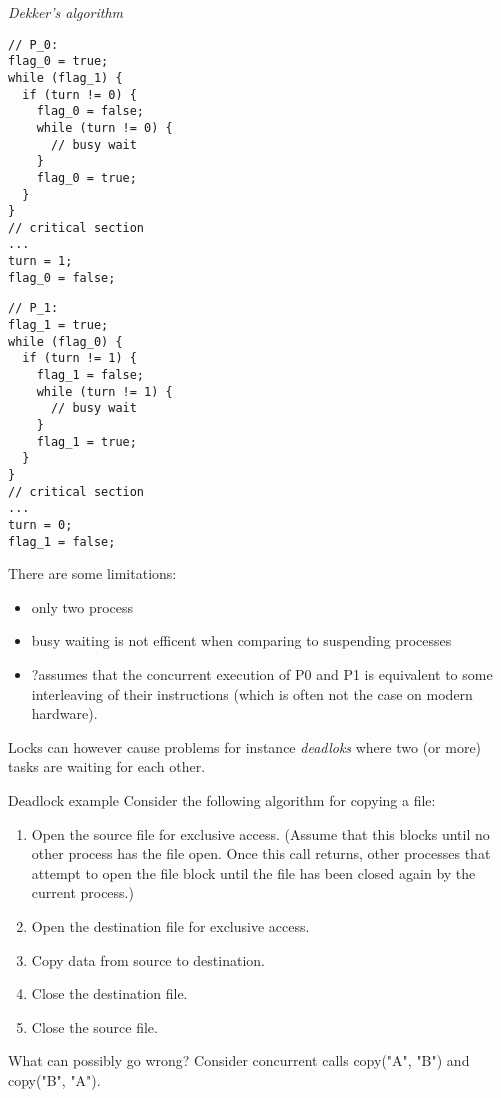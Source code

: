 \begin{definitionblock}{\textit{Dekker's algorithm}}

\begin{BVerbatim}[baseline=c]
// P_0:
flag_0 = true;
while (flag_1) {
  if (turn != 0) {
    flag_0 = false;
    while (turn != 0) {
      // busy wait
    }
    flag_0 = true;
  }
}
// critical section
...
turn = 1;
flag_0 = false;
\end{BVerbatim}
\begin{BVerbatim}[baseline=c]
// P_1:
flag_1 = true;
while (flag_0) {
  if (turn != 1) {
    flag_1 = false;
    while (turn != 1) {
      // busy wait
    }
    flag_1 = true;
  }
}
// critical section
...
turn = 0;
flag_1 = false;
\end{BVerbatim}

\end{definitionblock}
There are some limitations: 
\begin{itemize}
  \item only two process
  \item busy waiting is not efficent when comparing to suspending processes
  \item ?assumes that the concurrent execution of P0 and P1 is equivalent to
some interleaving of their instructions (which is often not the case on
modern hardware).
\end{itemize}

Locks can however cause problems for instance \textit{deadloks} where two (or more) tasks are waiting for each other.
\begin{exampleblock}{Deadlock example}
  Consider the following algorithm for copying a file:
  \begin{enumerate}
   \item Open the source file for exclusive access. (Assume that this blocks until
     no other process has the file open. Once this call returns, other processes
     that attempt to open the file block until the file has been closed again by
     the current process.)
   \item Open the destination file for exclusive access.
   \item Copy data from source to destination.
   \item Close the destination file.
   \item Close the source file.
  \end{enumerate}
What can possibly go wrong?
Consider concurrent calls copy("A", "B") and copy("B", "A").
\end{exampleblock}


